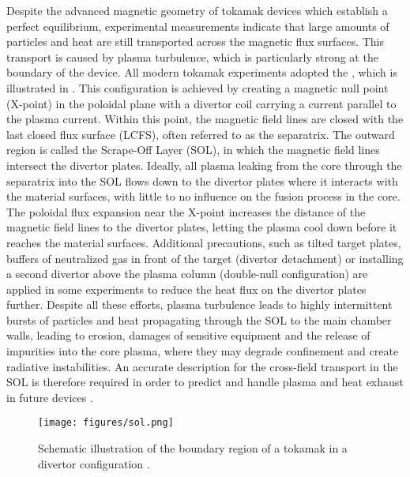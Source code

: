 Despite the advanced magnetic geometry of tokamak devices which establish a perfect equilibrium, experimental measurements indicate that large amounts of particles and heat are still transported across the magnetic flux surfaces. This transport is caused by plasma turbulence, which is particularly strong at the boundary of the device. All modern tokamak experiments adopted the , which is illustrated in . This configuration is achieved by creating a magnetic null point (X-point) in the poloidal plane with a divertor coil carrying a current parallel to the plasma current. Within this point, the magnetic field lines are closed with the last closed flux surface (LCFS), often referred to as the separatrix. The outward region is called the Scrape-Off Layer (SOL), in which the magnetic field lines intersect the divertor plates. Ideally, all plasma leaking from the core through the separatrix into the SOL flows down to the divertor plates where it interacts with the material surfaces, with little to no influence on the fusion process in the core. The poloidal flux expansion near the X-point increases the distance of the magnetic field lines to the divertor plates, letting the plasma cool down before it reaches the material surfaces. Additional precautions, such as tilted target plates, buffers of neutralized gas in front of the target
(divertor detachment) or installing a second divertor above the plasma column (double-null configuration) are applied in some experiments to reduce the heat flux on the divertor plates further. Despite all these efforts, plasma turbulence leads to highly intermittent bursts of particles and heat propagating through the SOL to the main chamber walls, leading to erosion, damages of sensitive equipment and the release of impurities into the core plasma, where they may degrade confinement and create radiative instabilities. An accurate description for the cross-field transport in the SOL is therefore required in order to predict and handle plasma and heat exhaust in future devices \cite{freidberg2008plasma}.
\begin{figure}[t]
	\centering
	\texttt{[image: figures/sol.png]}
	\caption{Schematic illustration of the boundary region of a tokamak in a divertor configuration \cite{eurofusion}.}
	\label{Fig:sol}
\end{figure}

